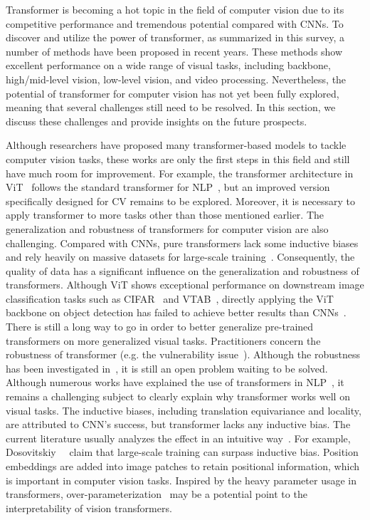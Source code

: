 Transformer is becoming a hot topic in the field of computer vision due to its competitive performance and tremendous potential compared with CNNs. To discover and utilize the power of transformer, as summarized in this survey, a number of methods have been proposed in recent years. These methods show excellent performance on a wide range of visual tasks, including backbone, high/mid-level vision, low-level vision, and video processing. Nevertheless, the potential of transformer for computer vision has not yet been fully explored, meaning that several challenges still need to be resolved. In this section, we discuss these challenges and provide insights on the future prospects.

Although researchers have proposed many transformer-based models to tackle computer vision tasks, these works are only the first steps in this field and still have much room for improvement. For example, the transformer architecture in ViT~ follows the standard transformer for NLP~, but an improved version specifically designed for CV remains to be explored. Moreover, it is necessary to apply transformer to more tasks other than those mentioned earlier.
The generalization and robustness of transformers for computer vision are also challenging. Compared with CNNs, pure transformers lack some inductive biases and rely heavily on massive datasets for large-scale training~. Consequently, the quality of data has a significant influence on the generalization and robustness of transformers. Although ViT shows exceptional performance on downstream image classification tasks such as CIFAR~ and VTAB~, directly applying the ViT backbone on object detection has failed to achieve better results than CNNs~. There is still a long way to go in order to better generalize pre-trained transformers on more generalized visual tasks. Practitioners concern the robustness of transformer (e.g. the vulnerability issue~). Although the robustness has been investigated in~, it is still an open problem waiting to be solved.
Although numerous works have explained the use of transformers in NLP~, it remains a challenging subject to clearly explain why transformer works well on visual tasks. The inductive biases, including translation equivariance and locality, are attributed to CNN’s success, but transformer lacks any inductive bias. The current literature usually analyzes the effect in an intuitive way~. For example, Dosovitskiy~\etal~ claim that large-scale training can surpass inductive bias. Position embeddings are added into image patches to retain positional information, which is important in computer vision tasks. Inspired by the heavy parameter usage in transformers, over-parameterization~ may be a potential point to the interpretability of vision transformers.

